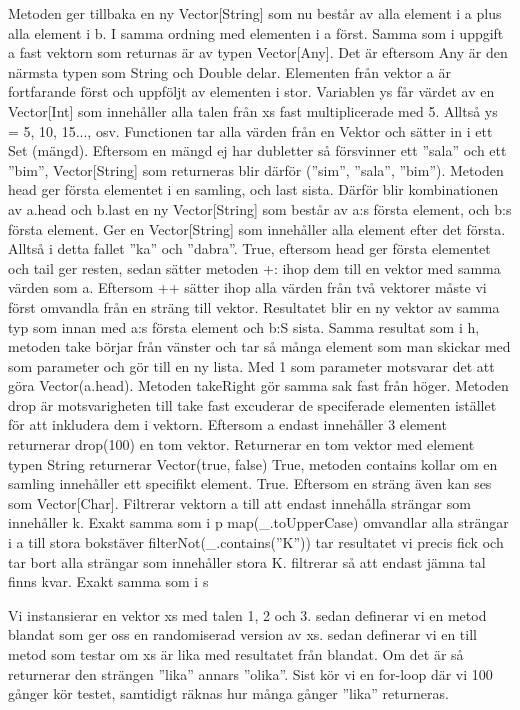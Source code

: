 \Subtask 
Metoden ger tillbaka en ny Vector[String] som nu består av alla element i a plus alla element i b. I samma ordning med elementen i a först.
\Subtask 
Samma som i uppgift a fast vektorn som returnas är av typen Vector[Any]. Det är eftersom Any är den närmsta typen som String och Double delar. Elementen från vektor a är fortfarande först och uppföljt av elementen i stor.
\Subtask 
Variablen ys får värdet av en Vector[Int] som innehåller alla talen från xs fast multiplicerade med 5. Alltså ys = 5, 10, 15..., osv.
\Subtask 
Functionen tar alla värden från en Vektor och sätter in i ett Set (mängd). Eftersom en mängd ej har dubletter så försvinner ett ''sala'' och ett ''bim'', Vector[String] som returneras blir därför (''sim'', ''sala'', ''bim'').
\Subtask 
Metoden head ger första elementet i en samling, och last sista. Därför blir kombinationen av a.head och b.last en ny Vector[String] som består av a:s första element, och b:s första element.
\Subtask 
Ger en Vector[String] som innehåller alla element efter det första. Alltså i detta fallet ''ka'' och ''dabra''.
\Subtask 
True, eftersom head ger första elementet och tail ger resten, sedan sätter metoden +: ihop dem till en vektor med samma värden som a.
\Subtask 
Eftersom ++ sätter ihop alla värden från två vektorer måste vi först omvandla från en sträng till vektor. Resultatet blir en ny vektor av samma typ som innan med a:s första element och b:S sista.
\Subtask 
Samma resultat som i h, metoden take börjar från vänster och tar så många element som man skickar med som parameter och gör till en ny lista. Med 1 som parameter motsvarar det att göra Vector(a.head). Metoden takeRight gör samma sak fast från höger.
\Subtask 
Metoden drop är motsvarigheten till take fast excuderar de speciferade elementen istället för att inkludera dem i vektorn.
\Subtask 
Eftersom a endast innehåller 3 element returnerar drop(100) en tom vektor.
\Subtask 
Returnerar en tom vektor med element typen String
\Subtask 
returnerar Vector(true, false) 
\Subtask 
True, metoden contains kollar om en samling innehåller ett specifikt element.
\Subtask 
True. Eftersom en sträng även kan ses som Vector[Char].
\Subtask 
Filtrerar vektorn a till att endast innehålla strängar som innehåller k.
\Subtask 
Exakt samma som i p
\Subtask 
map(\_.toUpperCase) omvandlar alla strängar i a till stora bokstäver
filterNot(\_.contains(''K'')) tar resultatet vi precis fick och tar bort alla strängar som innehåller stora K.
\Subtask 
filtrerar så att endast jämna tal finns kvar.
\Subtask 
Exakt samma som i s

\Task %
\Subtask 
Vi instansierar en vektor xs med talen 1, 2 och 3.
sedan definerar vi en metod blandat som ger oss en randomiserad version av xs.
sedan definerar vi en till metod som testar om xs är lika med resultatet från blandat. Om det är så returnerar den strängen ''lika'' annars ''olika''.
Sist kör vi en for-loop där vi 100 gånger kör testet, samtidigt räknas hur många gånger ''lika'' returneras.

